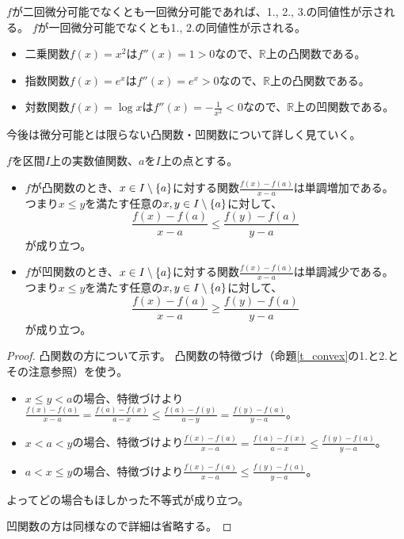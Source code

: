\begin{remark}
$f$が二回微分可能でなくとも一回微分可能であれば、1., 2., 3.の同値性が示される。
$f$が一回微分可能でなくとも1., 2.の同値性が示される。
\end{remark}

\begin{example}
\begin{itemize}
\item
二乗関数$f(x) = x^2$は$f''(x) = 1 > 0$なので、$\mathbb{R}$上の凸関数である。
\item
指数関数$f(x) = e^x$は$f''(x) = e^x > 0$なので、$\mathbb{R}$上の凸関数である。
\item
対数関数$f(x) = \log x$は$f''(x) = -\frac{1}{x^2} < 0$なので、$\mathbb{R}$上の凹関数である。
\end{itemize}
\end{example}

今後は微分可能とは限らない凸関数・凹関数について詳しく見ていく。

\begin{proposition}
$f$を区間$I$上の実数値関数、$a$を$I$上の点とする。
\begin{itemize}
\item
$f$が凸関数のとき、$x \in I\setminus\{a\}$に対する関数$\frac{f(x)-f(a)}{x-a}$は単調増加である。
つまり$x \le y$を満たす任意の$x, y \in I\setminus\{a\}$に対して、
$$
\frac{f(x)-f(a)}{x-a} \le \frac{f(y)-f(a)}{y-a}
$$
が成り立つ。
\item
$f$が凹関数のとき、$x \in I\setminus\{a\}$に対する関数$\frac{f(x)-f(a)}{x-a}$は単調減少である。
つまり$x \le y$を満たす任意の$x, y \in I\setminus\{a\}$に対して、
$$
\frac{f(x)-f(a)}{x-a} \ge \frac{f(y)-f(a)}{y-a}
$$
が成り立つ。
\end{itemize}
\end{proposition}

\begin{proof}
凸関数の方について示す。
凸関数の特徴づけ（命題\ref{t_convex}の1.と2.とその注意参照）を使う。
\begin{itemize}
\item
$x \le y < a$の場合、特徴づけより$\frac{f(x)-f(a)}{x-a} = \frac{f(a)-f(x)}{a-x} \le \frac{f(a)-f(y)}{a-y} = \frac{f(y)-f(a)}{y-a}$。
\item
$x < a < y$の場合、特徴づけより$\frac{f(x)-f(a)}{x-a} = \frac{f(a)-f(x)}{a-x} \le \frac{f(y)-f(a)}{y-a}$。
\item
$a < x \le y$の場合、特徴づけより$\frac{f(x)-f(a)}{x-a} \le \frac{f(y)-f(a)}{y-a}$。
\end{itemize}
よってどの場合もほしかった不等式が成り立つ。

凹関数の方は同様なので詳細は省略する。
\end{proof}


